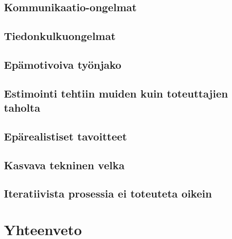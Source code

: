 \documentclass[a4paper]{article}
\begin{document}
\subsection{Kommunikaatio-ongelmat}

\subsection{Tiedonkulkuongelmat}

\subsection{Epämotivoiva työnjako}

\subsection{Estimointi tehtiin muiden kuin toteuttajien taholta}

\subsection{Epärealistiset tavoitteet}

\subsection{Kasvava tekninen velka}

\subsection{Iteratiivista prosessia ei toteuteta oikein}

\section{Yhteenveto}
\end{document}
